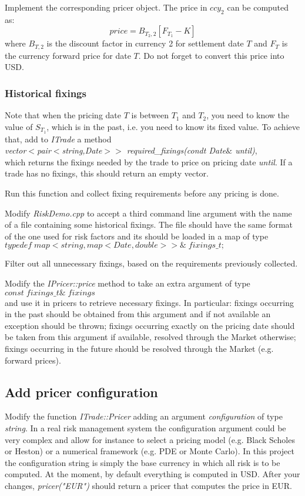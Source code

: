 \documentclass[10pt]{article}
\begin{document}
Implement the corresponding pricer object. The price in $ccy_2$ can be computed as:
$$
price=B_{T_2,2}[F_{T_1}-K]
$$
where $B_{T,2}$ is the discount factor in currency 2 for settlement date $T$ and $F_T$ is the currency forward price for date $T$. Do not forget to convert this price into USD.\\

\subsubsection{Historical fixings}
Note that when the pricing date $T$ is between $T_1$ and $T_2$, you need to know the value of $S_{T_1}$, which is in the past, i.e. you need to know its fixed value. To achieve that, add to \textit{ITrade} a method\\
\textit{vector$<$pair$<$string,Date$>>$ required\_fixings(condt Date$\&$ until)},\\
which returns the fixings needed by the trade to price on pricing date \textit{until}. If a trade has no fixings, this should return an empty vector.

Run this function and collect fixing requirements before any pricing is done.

Modify \textit{RiskDemo.cpp} to accept a third command line argument with the name of a file containing some historical fixings. The file should have the same format of the one used for risk factors and its should be loaded in a map of type\\
$typedef\; map<string,map<Date,double>>\&\; fixings\_t;$

Filter out all unnecessary fixings, based on the requirements previously collected.

Modify the \textit{IPricer::price} method to take an extra argument of type\\ $const\; fixings\_t\&\; fixings$\\ and use it in pricers to retrieve necessary fixings. In particular: fixings occurring in the past should be obtained from this argument and if not available an exception should be thrown; fixings occurring exactly on the pricing date should be taken from this argument if available, resolved through the Market otherwise; fixings occurring in the future should be resolved through the Market (e.g. forward prices).

\subsection{Add pricer configuration}
Modify the function \textit{ITrade::Pricer} adding an argument \textit{configuration} of type \textit{string}. In a real risk management system the configuration argument could be very complex and allow for instance to select a pricing model (e.g. Black Scholes or Heston) or a numerical framework (e.g. PDE or Monte Carlo). In this project the configuration string is simply the base currency in which all risk is to be computed. At the moment, by default everything is computed in USD. After your changes, \textit{pricer("EUR")} should return a pricer that computes the price in EUR.\\
\end{document}
